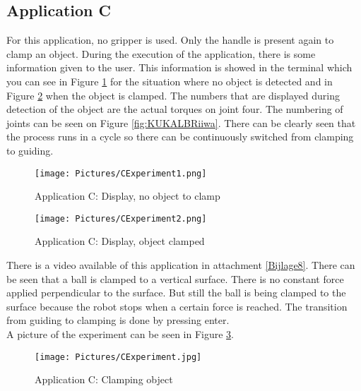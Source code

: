 \documentclass[11pt,a4paper]{report}
\begin{document}
\subsection{Application C}
For this application, no gripper is used. Only the handle is present again to clamp an object. During the execution of the application, there is some information given to the user. This information is showed in the terminal which you can see in Figure \ref{fig:CExperiment1} for the situation where no object is detected and in Figure \ref{fig:CExperiment2} when the object is clamped. The numbers that are displayed during detection of the object are the actual torques on joint four. The numbering of joints can be seen on Figure \ref{fig:KUKALBRiiwa}. There can be clearly seen that the process runs in a cycle so there can be continuously switched from clamping to guiding.
\begin{figure}[!ht]
	\centering
	\texttt{[image: Pictures/CExperiment1.png]}
	\caption{Application C: Display, no object to clamp}
	\label{fig:CExperiment1}
\end{figure}
\begin{figure}[!ht]
	\centering
	\texttt{[image: Pictures/CExperiment2.png]}
	\caption{Application C: Display, object clamped}
	\label{fig:CExperiment2}
\end{figure}
\newpage
There is a video available of this application in attachment \ref{Bijlage8}. There can be seen that a ball is clamped to a vertical surface. There is no constant force applied perpendicular to the surface. But still the ball is being clamped to the surface because the robot stops when a certain force is reached. The transition from guiding to clamping is done by pressing enter. \\
A picture of the experiment can be seen in Figure \ref{fig:CClamping}.
\begin{figure}[!ht]
	\centering
	\texttt{[image: Pictures/CExperiment.jpg]}
	\caption{Application C: Clamping object}
	\label{fig:CClamping}
\end{figure}
\newpage
\end{document}
